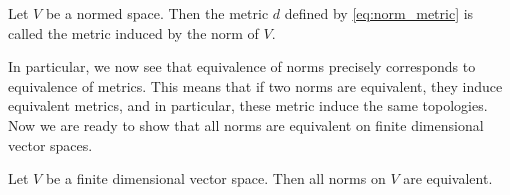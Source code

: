 \begin{definition}
	Let $V$ be a normed space. Then the metric $d$ defined by \eqref{eq:norm_metric} is called the metric induced by the norm of $V$.
\end{definition}

In particular, we now see that equivalence of norms precisely corresponds to equivalence of metrics. This means that if two norms are equivalent, they induce equivalent metrics, and in particular, these metric induce the same topologies. Now we are ready to show that all norms are equivalent on finite dimensional vector spaces.

\begin{theorem}
	Let $V$ be a finite dimensional vector space. Then all norms on $V$ are equivalent.
\end{theorem}

